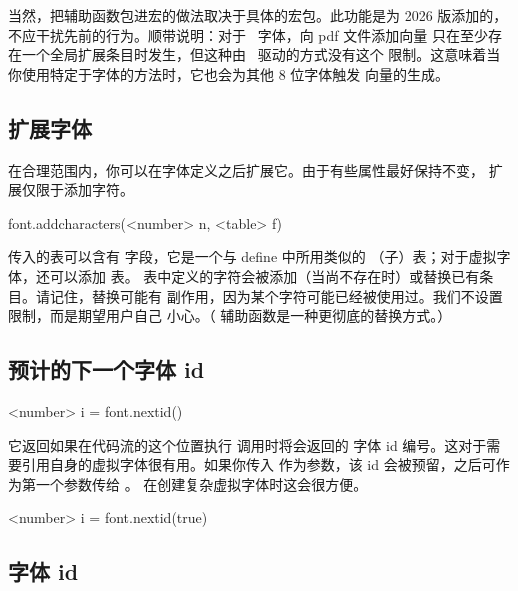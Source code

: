 当然，把辅助函数包进宏的做法取决于具体的宏包。此功能是为 2026 版添加的，
不应干扰先前的行为。顺带说明：对于 \TYPEONE\ 字体，向 pdf 文件添加向量
只在至少存在一个全局扩展条目时发生，但这种由 \LUA\ 驱动的方式没有这个
限制。这意味着当你使用特定于字体的方法时，它也会为其他 8 位字体触发
向量的生成。

\subsection{扩展字体}


在合理范围内，你可以在字体定义之后扩展它。由于有些属性最好保持不变，
扩展仅限于添加字符。

\begin{typing}
font.addcharacters(<number> n, <table> f)
\end{typing}

传入的表可以含有  字段，它是一个与 define 中所用类似的
（子）表；对于虚拟字体，还可以添加  表。
表中定义的字符会被添加（当尚不存在时）或替换已有条目。请记住，替换可能有
副作用，因为某个字符可能已经被使用过。我们不设置限制，而是期望用户自己
小心。（ 辅助函数是一种更彻底的替换方式。）

\subsection{预计的下一个字体 id}


\begin{typing}
<number> i =
    font.nextid()
\end{typing}

它返回如果在代码流的这个位置执行  调用时将会返回的
字体 id 编号。这对于需要引用自身的虚拟字体很有用。如果你传入 
作为参数，该 id 会被预留，之后可作为第一个参数传给 。
在创建复杂虚拟字体时这会很方便。

\begin{typing}
<number> i =
    font.nextid(true)
\end{typing}

\subsection{字体 id}


